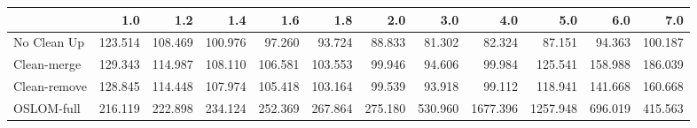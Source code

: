 \begin{tabular}{lrrrrrrrrrrr}
\toprule
{} &     1.0 &     1.2 &     1.4 &     1.6 &     1.8 &     2.0 &     3.0 &      4.0 &      5.0 &     6.0 &     7.0 \\
\midrule
No Clean Up  & 123.514 & 108.469 & 100.976 &  97.260 &  93.724 &  88.833 &  81.302 &   82.324 &   87.151 &  94.363 & 100.187 \\
Clean-merge  & 129.343 & 114.987 & 108.110 & 106.581 & 103.553 &  99.946 &  94.606 &   99.984 &  125.541 & 158.988 & 186.039 \\
Clean-remove & 128.845 & 114.448 & 107.974 & 105.418 & 103.164 &  99.539 &  93.918 &   99.112 &  118.941 & 141.668 & 160.668 \\
OSLOM-full   & 216.119 & 222.898 & 234.124 & 252.369 & 267.864 & 275.180 & 530.960 & 1677.396 & 1257.948 & 696.019 & 415.563 \\
\bottomrule
\end{tabular}
